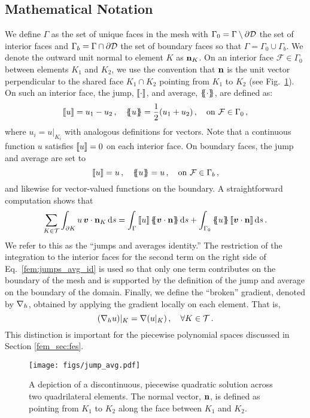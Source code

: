 \documentclass[../doc.tex]{subfiles}
\begin{document}
\subsection{Mathematical Notation}
We define $\Gamma$ as the set of unique faces in the mesh with $\Gamma_0 = \Gamma\setminus \partial\mathcal{D}$ the set of interior faces and $\Gamma_b = \Gamma \cap \partial\mathcal{D}$ the set of boundary faces so that $\Gamma = \Gamma_0 \cup \Gamma_b$. We denote the outward unit normal to element $K$ as $\boldsymbol{\mathrm{n}}_K$. On an interior face $\mathcal{F} \in \Gamma_0$ between elements $K_1$ and $K_2$, we use the convention that $\boldsymbol{\mathrm{n}}$ is the unit vector perpendicular to the shared face $K_1 \cap K_2$ pointing from $K_1$ to $K_2$ (see Fig.~\ref{fem:jump_avg_diag}). On such an interior face, the jump, $\left\llbracket\cdot \right\rrbracket$, and average, $\left\{\!\!\left\{\cdot\right\}\!\!\right\}$, are defined as:
	\begin{equation} \label{fem:jump_avg}
		\left\llbracket u \right\rrbracket = u_1 - u_2 \,, \quad \left\{\!\!\left\{u\right\}\!\!\right\} = \frac{1}{2}(u_1 + u_2) \,, \quad \mathrm{on} \ \mathcal{F} \in \Gamma_0 \,, 
	\end{equation}
where $u_i = u|_{K_i}$ with analogous definitions for vectors. Note that a continuous function $u$ satisfies $\left\llbracket u \right\rrbracket = 0$ on each interior face. 
On boundary faces, the jump and average are set to 
	\begin{equation} \label{fem:jump_avg_bdr}
		\jump{u} = u \,, \quad \avg{u} = u \,, \quad \mathrm{on} \ \mathcal{F} \in \Gamma_b \,,
	\end{equation}
and likewise for vector-valued functions on the boundary. A straightforward computation shows that 
	\begin{equation} \label{fem:jumps_avg_id}
		\sum_{K\in\meshT} \int_{\partial K} u\, \vec{v}\cdot\n_K \ud s = \int_\Gamma \jump{u} \avg{\vec{v}\cdot\n} \ud s + \int_{\Gamma_0} \avg{u}\jump{\vec{v}\cdot\n} \ud s \,. 
	\end{equation}
We refer to this as the ``jumps and averages identity.'' The restriction of the integration to the interior faces for the second term on the right side of Eq.~\ref{fem:jumps_avg_id} is used so that only one term contributes on the boundary of the mesh and is supported by the definition of the jump and average on the boundary of the domain. 
Finally, we define the ``broken'' gradient, denoted by $\nabla_h$, obtained by applying the gradient locally on each element. That is, 
	\begin{equation} \label{fem:broken_grad}
		(\nabla_h u)|_{K} = \nabla(u|_K) \,, \quad \forall K \in \mathcal{T} \,. 
	\end{equation}
This distinction is important for the piecewise polynomial spaces discussed in Section \ref{fem_sec:fes}. 
\begin{figure}
\centering
\texttt{[image: figs/jump\_avg.pdf]}
\caption{A depiction of a discontinuous, piecewise quadratic solution across two quadrilateral elements. The normal vector, $\boldsymbol{\mathrm{n}}$, is defined as pointing from $K_1$ to $K_2$ along the face between $K_1$ and $K_2$.}
\label{fem:jump_avg_diag}
\end{figure}
\end{document}
